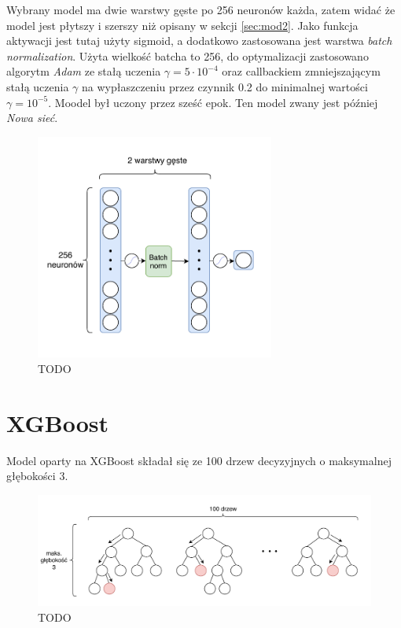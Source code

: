 \documentclass{pracalicmgr}
\begin{document}
	Wybrany model ma dwie warstwy gęste po 256 neuronów każda, zatem widać że model jest płytszy i szerszy niż opisany w sekcji \ref{sec:mod2}. Jako funkcja aktywacji jest tutaj użyty sigmoid, a dodatkowo zastosowana jest warstwa \textit{batch normalization}. Użyta wielkość batcha to 256, do optymalizacji  zastosowano algorytm \textit{Adam} ze stałą uczenia $\gamma = 5\cdot 10^{-4}$ oraz callbackiem %
	zmniejszającym stałą uczenia $\gamma$ na wypłaszczeniu %
	przez czynnik 0.2 do minimalnej wartości $\gamma = 10^{-5}$. Moodel był uczony przez sześć epok. Ten model zwany jest później \textit{Nowa sieć}.
	\begin{figure}
	\centering
	\includegraphics[width=0.7\textwidth]{best_neural_net.pdf}
	\caption{TODO}
	\label{fig:nn2}
	\end{figure}	
	
	\section{XGBoost}
	Model oparty na XGBoost składał się ze 100 drzew decyzyjnych o maksymalnej głębokości 3. %
	\begin{figure}
	\centering
	\includegraphics[width=1.0\textwidth]{xgb.pdf}
	\caption{TODO}
	\label{fig:xgb}
	\end{figure}
    
\end{document}
